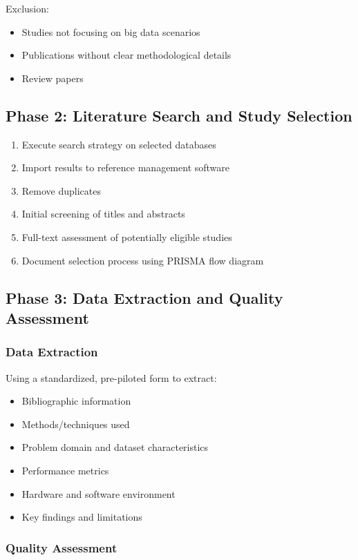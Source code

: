 \documentclass[a4paper,12pt]{article}
\begin{document}
Exclusion:
\begin{itemize}
    \item Studies not focusing on big data scenarios
    \item Publications without clear methodological details
    \item Review papers
\end{itemize}

\subsection{Phase 2: Literature Search and Study Selection}

\begin{enumerate}
    \item Execute search strategy on selected databases
    \item Import results to reference management software
    \item Remove duplicates
    \item Initial screening of titles and abstracts
    \item Full-text assessment of potentially eligible studies
    \item Document selection process using PRISMA flow diagram
\end{enumerate}

\subsection{Phase 3: Data Extraction and Quality Assessment}

\subsubsection{Data Extraction}
Using a standardized, pre-piloted form to extract:
\begin{itemize}
    \item Bibliographic information
    \item Methods/techniques used
    \item Problem domain and dataset characteristics
    \item Performance metrics
    \item Hardware and software environment
    \item Key findings and limitations
\end{itemize}

\subsubsection{Quality Assessment}
\end{document}
